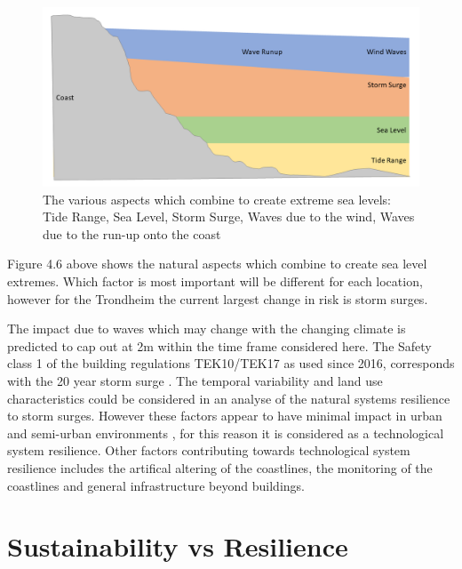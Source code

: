 \begin{figure}[h!]
    \centering
    \includegraphics[width=1\textwidth]{fig_theory/sea level extremes.png}
    \caption{The various aspects which combine to create extreme sea levels: Tide Range, Sea Level, Storm Surge, Waves due to the wind, Waves due to the run-up onto the coast}
    \label{fig:my_label}
\end{figure}

Figure 4.6 above shows the natural aspects which combine to create sea level extremes. Which factor is most important will be different for each location, however for the Trondheim the current largest change in risk is storm surges. 


The impact due to waves which may change with the changing climate is predicted to cap out at 2m within the time frame considered here. The Safety class 1 of the building regulations TEK10/TEK17 as used since 2016, corresponds with the 20 year storm surge \cite{tides_high_2022}. The temporal variability and land use characteristics could be considered in an analyse of the natural systems resilience to storm surges. However these factors appear to have minimal impact in urban and semi-urban environments \cite{hoffken_effects_2020}, for this reason it is considered as a technological system resilience. Other factors contributing towards technological system resilience includes the artifical altering of the coastlines, the monitoring of the coastlines and general infrastructure beyond buildings.

\section{Sustainability vs Resilience}


